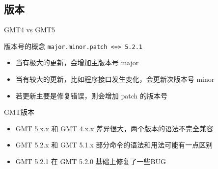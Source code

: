 \documentclass[UTF8, 11pt]{ctexbeamer}
\begin{document}
\subsection{版本}
\begin{frame}[fragile]{GMT4 vs GMT5}
\begin{block}{版本号的概念}
\centering\verb|major.minor.patch <=> 5.2.1|
\begin{itemize}
\item 当有极大的更新，会增加主版本号 major
\item 当有较大的更新，比如程序接口发生变化，会更新次版本号 minor
\item 若更新主要是修复错误，则会增加 patch 的版本号
\end{itemize}
\end{block}\pause
\begin{block}{GMT版本}
\begin{itemize}
\item GMT 5.x.x 和 GMT 4.x.x 差异很大，两个版本的语法不完全兼容
\item GMT 5.2.x 和 GMT 5.1.x 部分命令的语法和用法可能有一点区别
\item GMT 5.2.1 在 GMT 5.2.0 基础上修复了一些BUG
\end{itemize}
\end{block}
\end{frame}
\end{document}
